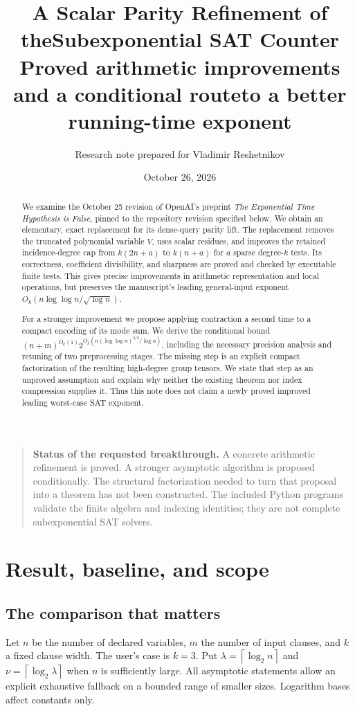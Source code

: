 \documentclass[11pt]{article}
\title{A Scalar Parity Refinement of the\newline Subexponential SAT Counter\\[0.5em]
\large Proved arithmetic improvements and a conditional route\newline to a better running-time exponent}
\author{Research note prepared for Vladimir Reshetnikov}
\date{October 26, 2026}
\theoremstyle{definition}
\theoremstyle{remark}
\newcommand{\ceil}[1]{\left\lceil #1\right\rceil}
\begin{document}
\maketitle
\begin{abstract}
We examine the October 25 revision of OpenAI's preprint \emph{The
Exponential Time Hypothesis is False}, pinned to the repository revision
specified below. We obtain an elementary, exact replacement for its dense-query
parity lift. The replacement removes the truncated polynomial variable $V$,
uses scalar residues, and improves the retained incidence-degree cap from
$k(2n+a)$ to $k(n+a)$ for $a$ sparse degree-$k$ tests. Its correctness,
coefficient divisibility, and sharpness are proved and checked by executable
finite tests. This gives precise improvements in arithmetic representation and
local operations, but preserves the manuscript's leading general-input exponent
$O_k(n\log\log n/\sqrt{\log n})$.

For a stronger improvement we propose applying contraction a second time to
a compact encoding of its mode sum. We derive the conditional bound
$(n+m)^{O_k(1)}2^{O_k(n(\log\log n)^{3/2}/\log n)}$, including the
necessary precision analysis and retuning of two preprocessing stages. The
missing step is an explicit compact factorization of the resulting high-degree
group tensors. We state that step as an unproved assumption and explain why
neither the existing theorem nor index compression supplies it. Thus this note
does not claim a newly proved improved leading worst-case SAT exponent.
\end{abstract}

\begin{quote}
\textbf{Status of the requested breakthrough.} A concrete arithmetic refinement
is proved. A stronger asymptotic algorithm is proposed conditionally. The
structural factorization needed to turn that proposal into a theorem has not
been constructed. The included Python programs validate the finite algebra and
indexing identities; they are not complete subexponential SAT solvers.
\end{quote}

\newpage
{\small\setlength{\parskip}{0pt}\tableofcontents}
\newpage

\section{Result, baseline, and scope}

\subsection{The comparison that matters}
Let $n$ be the number of declared variables, $m$ the number of input clauses,
and $k$ a fixed clause width. The user's case is $k=3$. Put
$\lambda=\ceil{\log_2 n}$ and $\nu=\ceil{\log_2\lambda}$ when $n$ is
sufficiently large. All asymptotic statements allow an explicit exhaustive
fallback on a bounded range of smaller sizes. Logarithm bases affect constants
only.
\end{document}
